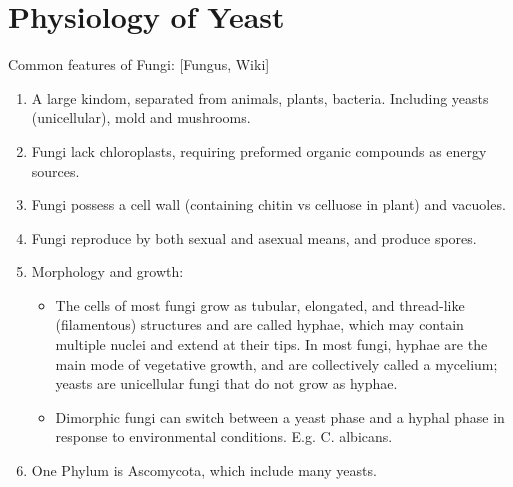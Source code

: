 \documentclass{report}
\begin{document}
\section{Physiology of Yeast}
	
Common features of Fungi: [Fungus, Wiki]
\begin{enumerate}
	\item A large kindom, separated from animals, plants, bacteria. Including yeasts (unicellular), mold and mushrooms. 
	\item Fungi lack chloroplasts, requiring preformed organic compounds as energy sources. 
	\item Fungi possess a cell wall (containing chitin vs celluose in plant) and vacuoles. 
	\item Fungi reproduce by both sexual and asexual means, and produce spores. 
	\item Morphology and growth:
	\begin{itemize}
		\item The cells of most fungi grow as tubular, elongated, and thread-like (filamentous) structures and are called hyphae, which may contain multiple nuclei and extend at their tips. In most fungi, hyphae are the main mode of vegetative growth, and are collectively called a mycelium; yeasts are unicellular fungi that do not grow as hyphae.
		\item Dimorphic fungi can switch between a yeast phase and a hyphal phase in response to environmental conditions. E.g. C. albicans. 
	\end{itemize}
	\item One Phylum is Ascomycota, which include many yeasts. 
\end{enumerate}
\end{document}
